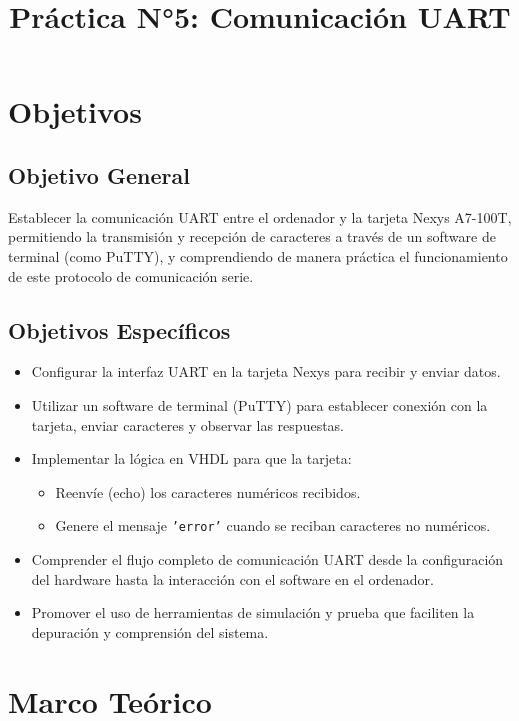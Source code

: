 \documentclass[a4paper,12pt]{article}
\title{Práctica N°5: Comunicación UART}
\date{}
\begin{document}
\maketitle
\tableofcontents
\newpage

\section{Objetivos}

\subsection{Objetivo General}
Establecer la comunicación UART entre el ordenador y la tarjeta Nexys A7-100T, permitiendo la transmisión y recepción de caracteres a través de un software de terminal (como PuTTY), y comprendiendo de manera práctica el funcionamiento de este protocolo de comunicación serie.

\subsection{Objetivos Específicos}
\begin{itemize}
    \item Configurar la interfaz UART en la tarjeta Nexys para recibir y enviar datos.
    \item Utilizar un software de terminal (PuTTY) para establecer conexión con la tarjeta, enviar caracteres y observar las respuestas.
    \item Implementar la lógica en VHDL para que la tarjeta:
    \begin{itemize}
        \item Reenvíe (echo) los caracteres numéricos recibidos.
        \item Genere el mensaje \texttt{'error'} cuando se reciban caracteres no numéricos.
    \end{itemize}
    \item Comprender el flujo completo de comunicación UART desde la configuración del hardware hasta la interacción con el software en el ordenador.
    \item Promover el uso de herramientas de simulación y prueba que faciliten la depuración y comprensión del sistema.
\end{itemize}

\section{Marco Teórico}
\end{document}
